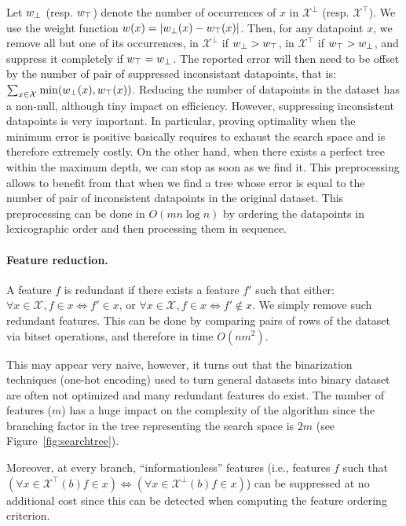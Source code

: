 \documentclass{llncs}
\newcommand{\setex}[1]{\ensuremath{{\mathcal X}^{#1}}\xspace}
\newcommand{\posex}{{\setex{\top}}\xspace}
\newcommand{\negex}{{\setex{\bot}}\xspace}
\newcommand{\allex}{{\setex{}}\xspace}
\newcommand{\afeat}[0]{\ensuremath{f}}
\newcommand{\weight}[1][]{\ensuremath{\ifthenelse{\equal{#1}{}}{w}{w({#1})}}}
\newcommand{\abranch}[0]{\ensuremath{b}}
\newcommand{\numex}[0]{\ensuremath{n}}
\newcommand{\numfeat}[0]{\ensuremath{m}}
\begin{document}
Let $\weight_{\bot}$ (resp. $\weight_{\top}$) denote the number of occurrences of $x$ in $\setex{\bot}$ (resp. $\setex{\top}$). We use the weight function $\weight[x] = |\weight_{\bot}(x) - \weight_{\top}(x)|$. Then, for any datapoint $x$, we remove all but one of its occurrences, in $\setex{\bot}$ if $\weight_{\bot}>\weight_{\top}$, in $\setex{\top}$ if $\weight_{\top}>\weight_{\bot}$, and suppress it completely if $\weight_{\top}=\weight_{\bot}$.
The reported error will then need to be offset by the number of pair of suppressed inconsistant datapoints, that is:
$
\sum_{x \in \allex}\min(\weight_{\bot}(x), \weight_{\top}(x))
$.
Reducing the number of datapoints in the dataset has a non-null, although tiny impact on efficiency. However, suppressing inconsistent datapoints is very important. In particular, proving optimality when the minimum error is positive basically requires to exhaust the search space and is therefore extremely costly. On the other hand, when there exists a perfect tree within the maximum depth, we can stop as soon as we find it. This preprocessing allows to benefit from that when we find a tree whose error is equal to the number of pair of inconsistent datapoints in the original dataset.
This preprocessing can be done in $O(\numfeat \numex \log \numex)$ by ordering the datapoints in lexicographic order and then processing them in sequence.

\paragraph{Feature reduction.}

A feature $\afeat$ is redundant if there exists a feature $\afeat'$ such that either: $\forall x \in \allex, \afeat \in x \iff \afeat' \in x$, or $\forall x \in \allex, \afeat \in x \iff \afeat' \not\in x$. We simply remove such redundant features. This can be done by comparing pairs of rows of the dataset via bitset operations, and therefore in time $O(\numex\numfeat^2)$.

This may appear very naive, however, it turns out that the binarization techniques (one-hot encoding) used to turn general datasets into binary dataset are often not optimized and many redundant features do exist. The number of features ($\numfeat$) has a huge impact on the complexity of the algorithm since the branching factor in the tree representing the search space is $2\numfeat$ (see Figure~\ref{fig:searchtree}).

Moreover, at every branch, ``informationless'' features (i.e., features $\afeat$ such that $(\forall x \in \posex(\abranch) \afeat \in x) \iff (\forall x \in \negex(\abranch) \afeat \in x)$) can be suppressed at no additional cost since this can be detected when computing the feature ordering criterion.
\end{document}
